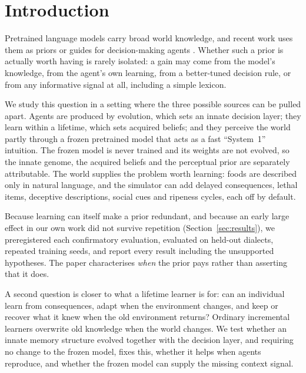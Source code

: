 \documentclass[11pt]{article}
\begin{document}
\section{Introduction}
Pretrained language models carry broad world knowledge, and recent work uses them as priors or guides for decision-making agents \citep{yan2025efficient,du2023guiding,ahn2022saycan}. Whether such a prior is actually worth having is rarely isolated: a gain may come from the model's knowledge, from the agent's own learning, from a better-tuned decision rule, or from any informative signal at all, including a simple lexicon.

We study this question in a setting where the three possible sources can be pulled apart. Agents are produced by evolution, which sets an innate decision layer; they learn within a lifetime, which sets acquired beliefs; and they perceive the world partly through a frozen pretrained model that acts as a fast ``System~1'' intuition. The frozen model is never trained and its weights are not evolved, so the innate genome, the acquired beliefs and the perceptual prior are separately attributable. The world supplies the problem worth learning: foods are described only in natural language, and the simulator can add delayed consequences, lethal items, deceptive descriptions, social cues and ripeness cycles, each off by default.

Because learning can itself make a prior redundant, and because an early large effect in our own work did not survive repetition (Section~\ref{sec:results}), we preregistered each confirmatory evaluation, evaluated on held-out dialects, repeated training seeds, and report every result including the unsupported hypotheses. The paper characterises \emph{when} the prior pays rather than asserting that it does.

A second question is closer to what a lifetime learner is for: can an individual learn from consequences, adapt when the environment changes, and keep or recover what it knew when the old environment returns? Ordinary incremental learners overwrite old knowledge when the world changes. We test whether an innate memory structure evolved together with the decision layer, and requiring no change to the frozen model, fixes this, whether it helps when agents reproduce, and whether the frozen model can supply the missing context signal.
\end{document}
